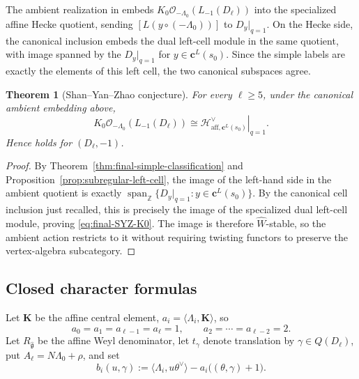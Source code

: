 \documentclass[11pt]{amsart}
\newtheorem{theorem}{Theorem}[section]
\theoremstyle{remark}
\numberwithin{equation}{section}
\begin{document}
The ambient realization in \cite[Section~5.2]{ShanYanZhao2026} embeds
\(K_0\mathcal O_{-\Lambda_0}(L_{-1}(D_\ell))\) into the specialized affine
Hecke quotient, sending \([L(y\circ(-\Lambda_0))]\) to \(D_y|_{q=1}\).
On the Hecke side, the canonical inclusion
\cite[Equation~(2.1.2)]{ShanYanZhao2026} embeds the dual left-cell module in
the same quotient, with image spanned by the \(D_y|_{q=1}\) for
\(y\in\mathbf c^L(s_0)\).  Since the simple labels are exactly the elements
of this left cell, the two canonical subspaces agree.

\begin{theorem}[Shan--Yan--Zhao conjecture]
For every \(\ell\ge5\), under the canonical ambient embedding above,
\begin{equation}
\label{eq:final-SYZ-K0}
   K_0\mathcal O_{-\Lambda_0}
   \!\left(L_{-1}(D_\ell)\right)
   \cong
   \left.
      \mathcal H^\vee_{\mathrm{aff},\mathbf c^L(s_0)}
   \right|_{q=1}.
\end{equation}
Hence \cite[Conjecture~5.2.1]{ShanYanZhao2026} holds for
\((D_\ell,-1)\).
\end{theorem}

\begin{proof}
By Theorem~\ref{thm:final-simple-classification} and
Proposition~\ref{prop:subregular-left-cell}, the image of the left-hand side
in the ambient quotient is exactly
\(\operatorname{span}_{\mathbb Z}\{D_y|_{q=1}:y\in\mathbf c^L(s_0)\}\).
By the canonical cell inclusion just recalled, this is precisely the image
of the specialized dual left-cell module, proving
\eqref{eq:final-SYZ-K0}.  The image is therefore
\(\widehat W\)-stable, so the ambient action restricts to it without requiring
twisting functors to preserve the vertex-algebra subcategory.
\end{proof}

\subsection{Closed character formulas}

Let \(\mathbf K\) be the affine central element,
\(a_i=\langle\Lambda_i,\mathbf K\rangle\), so
\[
   a_0=a_1=a_{\ell-1}=a_\ell=1,
   \qquad
   a_2=\cdots=a_{\ell-2}=2.
\]
Let \(R_{\widehat{\mathfrak g}}\) be the affine Weyl denominator, let
\(t_\gamma\) denote translation by \(\gamma\in Q(D_\ell)\), put
\(A_\ell=N\Lambda_0+\rho\), and set
\[
   b_i(u,\gamma)
   :=\langle\Lambda_i,u\theta^\vee\rangle
      -a_i\bigl((\theta,\gamma)+1\bigr).
\]
\end{document}
